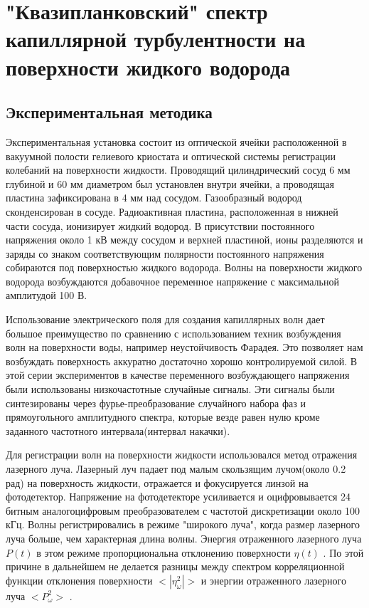 \chapter{"Квазипланковский" спектр капиллярной турбулентности на поверхности жидкого водорода}
\section{Экспериментальная методика} %
 Экспериментальная установка состоит из оптической ячейки расположенной в вакуумной полости гелиевого криостата и оптической системы регистрации колебаний на поверхности жидкости. Проводящий цилиндрический сосуд 6 мм глубиной и 60 мм диаметром был установлен внутри ячейки, а проводящая пластина зафиксирована в 4 мм над сосудом. Газообразный водород сконденсирован в сосуде. Радиоактивная пластина, расположенная в нижней части сосуда, ионизирует жидкий водород. В присутствии постоянного напряжения около 1 кВ между сосудом и верхней пластиной, ионы разделяются и заряды со знаком соответствующим полярности постоянного напряжения собираются под поверхностью жидкого водорода. Волны на поверхности жидкого водорода возбуждаются добавочное переменное напряжение с максимальной амплитудой 100 В.

	Использование электрического поля для создания капиллярных волн дает большое преимущество по сравнению с использованием техник возбуждения волн на поверхности воды, например неустойчивость Фарадея. Это позволяет нам возбуждать поверхность аккуратно достаточно хорошо контролируемой силой. В этой серии экспериментов в качестве переменного возбуждающего напряжения были использованы низкочастотные случайные сигналы. Эти сигналы были синтезированы через фурье-преобразование случайного набора фаз и прямоугольного амплитудного спектра, которые везде равен нулю кроме заданного частотного интервала(интервал накачки).

	Для регистрации волн на поверхности жидкости использовался метод отражения лазерного луча. Лазерный луч падает под малым скользящим лучом(около 0.2 рад) на поверхность жидкости, отражается и фокусируется линзой на фотодетектор. Напряжение на фотодетекторе усиливается и оцифровывается 24 битным аналогоцифровым преобразователем с частотой дискретизации около 100 кГц. Волны регистрировались в режиме "широкого луча", когда размер лазерного луча больше, чем характерная длина волны. Энергия отраженного лазерного луча $P(t)$  в этом режиме пропорциональна отклонению поверхности $\eta(t)$ \cite{Brazhnikov_bound_freq}. По этой причине в дальнейшем не делается разницы между спектром корреляционной функции отклонения поверхности $<|\eta_\omega^2|>$ и энергии отраженного лазерного луча $<P_\omega^2>$ .

